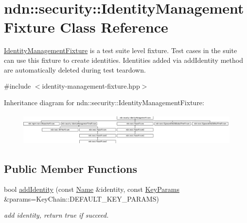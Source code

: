 \hypertarget{classndn_1_1security_1_1IdentityManagementFixture}{}\section{ndn\+:\+:security\+:\+:Identity\+Management\+Fixture Class Reference}
\label{classndn_1_1security_1_1IdentityManagementFixture}


\hyperlink{classndn_1_1security_1_1IdentityManagementFixture}{Identity\+Management\+Fixture} is a test suite level fixture. Test cases in the suite can use this fixture to create identities. Identities added via add\+Identity method are automatically deleted during test teardown.  




{\ttfamily \#include $<$identity-\/management-\/fixture.\+hpp$>$}

Inheritance diagram for ndn\+:\+:security\+:\+:Identity\+Management\+Fixture\+:\begin{figure}[H]
\begin{center}
\leavevmode
\includegraphics[height=1.696970cm]{classndn_1_1security_1_1IdentityManagementFixture}
\end{center}
\end{figure}
\subsection*{Public Member Functions}
\begin{DoxyCompactItemize}
\item 
bool \hyperlink{classndn_1_1security_1_1IdentityManagementFixture_a113c959a4bd54e4685454c69264dbe65}{add\+Identity} (const \hyperlink{classndn_1_1Name}{Name} \&identity, const \hyperlink{classndn_1_1KeyParams}{Key\+Params} \&params=Key\+Chain\+::\+D\+E\+F\+A\+U\+L\+T\+\_\+\+K\+E\+Y\+\_\+\+P\+A\+R\+A\+MS)\hypertarget{classndn_1_1security_1_1IdentityManagementFixture_a113c959a4bd54e4685454c69264dbe65}{}\label{classndn_1_1security_1_1IdentityManagementFixture_a113c959a4bd54e4685454c69264dbe65}

\begin{DoxyCompactList}\small\item\em add identity, return true if succeed. \end{DoxyCompactList}\end{DoxyCompactItemize}
